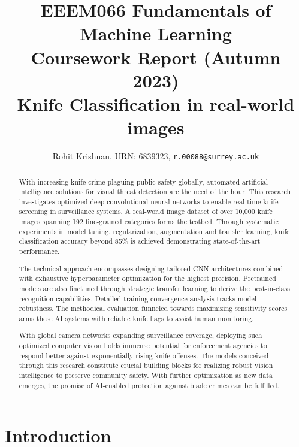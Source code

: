 \documentclass[10pt,twocolumn,letterpaper]{article}
\begin{document}
\title{EEEM066 Fundamentals of Machine Learning \\ Coursework Report (Autumn 2023) \\ Knife Classification in real-world images}

\author{Rohit Krishnan, {URN: 6839323},
  {\tt r.00088@surrey.ac.uk}
}
\maketitle

\begin{abstract}

With increasing knife crime plaguing public safety globally, automated artificial intelligence solutions for visual threat detection are the need of the hour. This research investigates optimized deep convolutional neural networks to enable real-time knife screening in surveillance systems. A real-world image dataset of over 10,000 knife images spanning 192 fine-grained categories forms the testbed. Through systematic experiments in model tuning, regularization, augmentation and transfer learning, knife classification accuracy beyond 85\% is achieved demonstrating state-of-the-art performance.

The technical approach encompasses designing tailored CNN architectures combined with exhaustive hyperparameter optimization for the highest precision. Pretrained models are also finetuned through strategic transfer learning to derive the best-in-class recognition capabilities. Detailed training convergence analysis tracks model robustness. The methodical evaluation funneled towards maximizing sensitivity scores arms these AI systems with reliable knife flags to assist human monitoring.

With global camera networks expanding surveillance coverage, deploying such optimized computer vision holds immense potential for enforcement agencies to respond better against exponentially rising knife offenses. The models conceived through this research constitute crucial building blocks for realizing robust vision intelligence to preserve community safety. With further optimization as new data emerges, the promise of AI-enabled protection against blade crimes can be fulfilled.
\end{abstract}

\section{Introduction}
\label{sec:intro}
\end{document}
